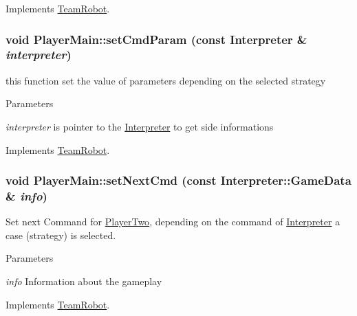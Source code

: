 Implements \hyperlink{classTeamRobot_a9b84df51ca16a7203fdb6498ea6741da}{TeamRobot}.

\hypertarget{classPlayerMain_a5c4af159392663660f91809052422945}{
\subsubsection[{setCmdParam}]{\setlength{\rightskip}{0pt plus 5cm}void PlayerMain::setCmdParam (const {\bf Interpreter} \& {\em interpreter})}}
\label{classPlayerMain_a5c4af159392663660f91809052422945}


this function set the value of parameters depending on the selected strategy 


\begin{DoxyParams}{Parameters}
\item[{\em interpreter}]is pointer to the \hyperlink{classInterpreter}{Interpreter} to get side informations \end{DoxyParams}


Implements \hyperlink{classTeamRobot_a34c0fd6986c510d4025e5752b3c0e49a}{TeamRobot}.

\hypertarget{classPlayerMain_a8f0320189df15529662c7f16d2f74084}{
\subsubsection[{setNextCmd}]{\setlength{\rightskip}{0pt plus 5cm}void PlayerMain::setNextCmd (const {\bf Interpreter::GameData} \& {\em info})}}
\label{classPlayerMain_a8f0320189df15529662c7f16d2f74084}


Set next Command for \hyperlink{classPlayerTwo}{PlayerTwo}, depending on the command of \hyperlink{classInterpreter}{Interpreter} a case (strategy) is selected. 


\begin{DoxyParams}{Parameters}
\item[{\em info}]Information about the gameplay \end{DoxyParams}


Implements \hyperlink{classTeamRobot_a65f9a2b7464dfac3f4a0336810cf574f}{TeamRobot}.



